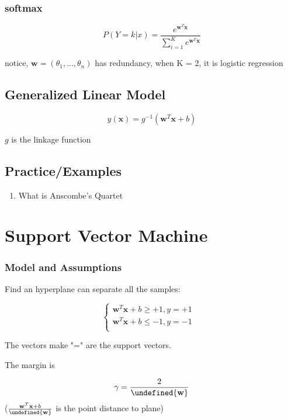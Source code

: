 \documentclass[11pt, openany]{book}              %
\let\norm\undefined %
\DeclarePairedDelimiter\norm{\lVert}{\rVert}
\begin{document}
\subsection{softmax}

$$P(Y=k|x) = \frac{e^{\mathbf{w}^T\mathbf{x}}}{\sum_{i=1}^{K}e^{\mathbf{w}^T\mathbf{x}}}$$

notice, $\mathbf{w} = (\theta_1, ..., \theta_n)$ has redundancy, when K = 2, it is logistic regression

\section{Generalized Linear Model}

$$y(\mathbf{x}) = g^{-1}(\mathbf{w}^T\mathbf{x} + b)$$

$g$ is the linkage function

\section{Practice/Examples}

\begin{enumerate}
    \item What is Anscombe's Quartet 
\end{enumerate}


\chapter{Support Vector Machine}

\subsection{Model and Assumptions}

Find an hyperplane can separate all the samples:

$$\left\{
         \begin{array}{lr}
             \mathbf{w}^T\mathbf{x} + b \geq +1,  y = +1 &  \\
             \mathbf{w}^T\mathbf{x} + b \leq -1,  y = -1  
             \\			  
             \end{array}
   \right.$$ 

The vectors make "=" are the support vectors.

The margin is

$$\gamma = \frac{2}{\norm{\mathbf{w}}} $$ ($\frac{\mathbf{w}^T\mathbf{x} + b}{\norm{\mathbf{w}}}$ is the point distance to plane)
\end{document}
